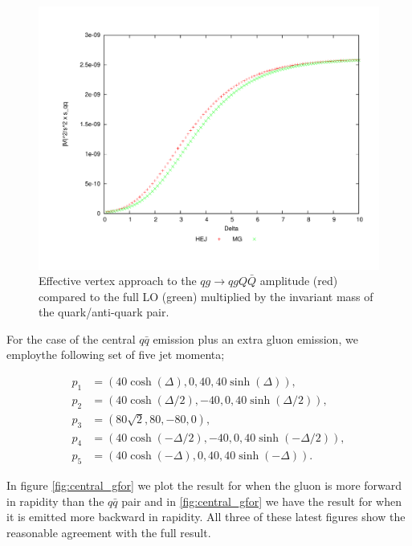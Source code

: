 \begin{figure}[H]
\centering
\includegraphics[scale=0.45]{Images/qg_qgQQx_sqq.pdf}
\caption{Effective vertex approach to the $qg \to qgQ\bar{Q}$ amplitude (red) compared to the full LO (green) multiplied by the invariant mass of the quark/anti-quark pair.}
\label{fig:qg_qqq_emis}
\end{figure}

For the case of the central $q\bar{q}$ emission plus an extra gluon emission, we employthe following set of five jet momenta;

\begin{equation}
\begin{split}
p_1 & = (40 \cosh(\Delta), 0, 40, 40 \sinh(\Delta)), \\
p_2 & = (40 \cosh(\Delta/2), -40, 0, 40 \sinh(\Delta/2)), \\
p_3 & = (80 \sqrt{2}, 80, -80, 0), \\
p_4 & = (40 \cosh(-\Delta/2), -40, 0, 40 \sinh(-\Delta/2)), \\
p_5 & = (40 \cosh(-\Delta), 0, 40, 40 \sinh(-\Delta)). 
\end{split}
\end{equation}

In figure \ref{fig:central_gfor} we plot the result for when the gluon is more forward in rapidity than the $q\bar{q}$ pair and in \ref{fig:central_gfor} we have the result for when it is emitted more backward in rapidity. All three of these latest figures show the reasonable agreement with the full result. 

